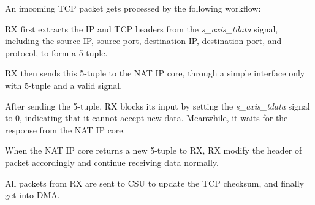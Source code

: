    An imcoming TCP packet gets processed by the following workflow:

    RX first extracts the IP and TCP headers from the \emph{s\_axis\_tdata} signal, including the source IP, source port, destination IP, destination port, and protocol, to form a 5-tuple.

    RX then sends this 5-tuple to the NAT IP core, through a simple interface only with 5-tuple and a valid signal.

    After sending the 5-tuple, RX blocks its input by setting the \emph{s\_axis\_tdata} signal to 0, indicating that it cannot accept new data. Meanwhile, it waits for the response from the NAT IP core.

    When the NAT IP core returns a new 5-tuple to RX, RX modify the header of packet accordingly and continue receiving data normally.

    All packets from RX are sent to CSU to update the TCP checksum, and finally get into DMA. 
